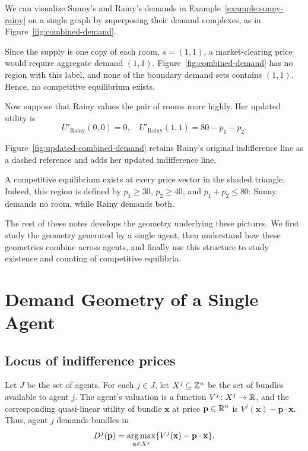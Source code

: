 \documentclass[../../main.tex]{subfiles}
\begin{document}
\begin{example}
    We can visualize Sunny's and Rainy's demands in
    Example~\ref{example:sunny-rainy} on a single graph by superposing their demand
    complexes, as in Figure~\ref{fig:combined-demand}.

    \CombinedDemandFigure
    
    Since the supply is one copy of each room, $s=(1,1)$, a market-clearing
    price would require aggregate demand $(1,1)$. Figure~\ref{fig:combined-demand}
    has no region with this label, and none of the boundary demand sets
    contains $(1,1)$. Hence, no competitive equilibrium exists.

    Now suppose that Rainy values the pair of rooms more highly. Her updated
    utility is
    \[
        U'_{\text{Rainy}}(0,0)=0,\quad
        U'_{\text{Rainy}}(1,1)=80-p_1-p_2.
    \]

    Figure~\ref{fig:updated-combined-demand} retains Rainy's original
    indifference line as a dashed reference and adds her updated indifference
    line.

    \UpdatedCombinedDemandFigure

    A competitive equilibrium exists at every price vector in the shaded
    triangle. Indeed, this region is defined by
    $p_1\ge 30$, $p_2\ge 40$, and $p_1+p_2\le 80$: Sunny demands no room,
    while Rainy demands both.
\end{example}

The rest of these notes develops the geometry underlying these pictures.
We first study the geometry generated by a single agent, then understand
how these geometries combine across agents, and finally use this structure
to study existence and counting of competitive equilibria.

\section{Demand Geometry of a Single Agent}

\subsection{Locus of indifference prices}

Let $J$ be the set of agents. For each $j \in J$, let
$X^j \subseteq \mathbb{Z}^n$ be the set of bundles available to agent $j$. 
The agent's valuation is a function $V^j\colon X^j \to \mathbb{R}$, 
and the corresponding quasi-linear utility of bundle $\mathbf{x}$ 
at price $\mathbf{p}\in\mathbb{R}^n$ is $V^j(\mathbf{x})-\mathbf{p}\cdot \mathbf{x}$. 
Thus, agent $j$ demands bundles in
\[
    D^j(\mathbf{p})=\operatorname*{arg\,max}_{\mathbf{x} \in X^j}\{V^j(\mathbf{x})-\mathbf{p}\cdot \mathbf{x}\}.
\]
\end{document}
